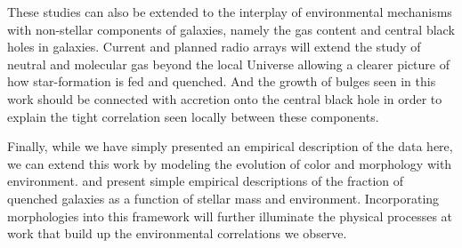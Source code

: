 These studies can also be extended to the interplay of environmental
mechanisms with non-stellar components of galaxies, namely the gas
content and central black holes in galaxies. Current and planned radio
arrays will extend the study of neutral and molecular gas beyond the
local Universe allowing a clearer picture of how star-formation is fed and
quenched. And the growth of bulges seen in this work should be
connected with accretion onto the central black hole in order to
explain the tight correlation seen locally between these components.

Finally, while we have simply presented an empirical description of
the data here, we can extend this work by modeling the evolution of
color and morphology with environment. \citet{Peng2010} and
\citet{Wetzel2012b} present simple empirical descriptions of the
fraction of quenched galaxies as a function of stellar mass and
environment. Incorporating morphologies into this framework will
further illuminate the physical processes at work that build up the
environmental correlations we observe.

